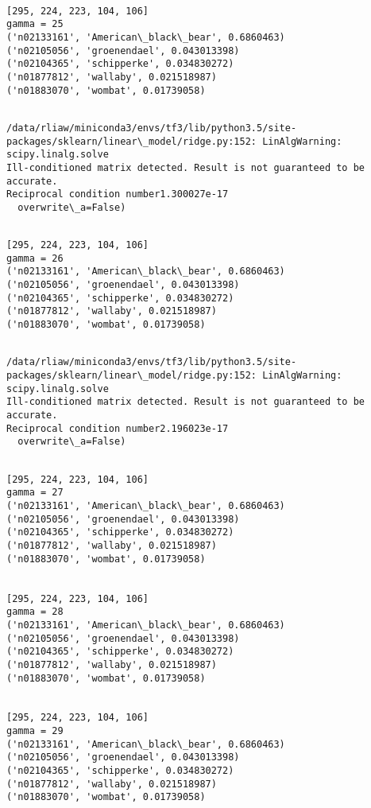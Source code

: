 \documentclass[11pt]{article}
\begin{document}
    \begin{Verbatim}[commandchars=\\\{\}]

[295, 224, 223, 104, 106]
gamma = 25
('n02133161', 'American\_black\_bear', 0.6860463)
('n02105056', 'groenendael', 0.043013398)
('n02104365', 'schipperke', 0.034830272)
('n01877812', 'wallaby', 0.021518987)
('n01883070', 'wombat', 0.01739058)


    \end{Verbatim}

    \begin{Verbatim}[commandchars=\\\{\}]
/data/rliaw/miniconda3/envs/tf3/lib/python3.5/site-packages/sklearn/linear\_model/ridge.py:152: LinAlgWarning: scipy.linalg.solve
Ill-conditioned matrix detected. Result is not guaranteed to be accurate.
Reciprocal condition number1.300027e-17
  overwrite\_a=False)

    \end{Verbatim}

    \begin{Verbatim}[commandchars=\\\{\}]

[295, 224, 223, 104, 106]
gamma = 26
('n02133161', 'American\_black\_bear', 0.6860463)
('n02105056', 'groenendael', 0.043013398)
('n02104365', 'schipperke', 0.034830272)
('n01877812', 'wallaby', 0.021518987)
('n01883070', 'wombat', 0.01739058)


    \end{Verbatim}

    \begin{Verbatim}[commandchars=\\\{\}]
/data/rliaw/miniconda3/envs/tf3/lib/python3.5/site-packages/sklearn/linear\_model/ridge.py:152: LinAlgWarning: scipy.linalg.solve
Ill-conditioned matrix detected. Result is not guaranteed to be accurate.
Reciprocal condition number2.196023e-17
  overwrite\_a=False)

    \end{Verbatim}

    \begin{Verbatim}[commandchars=\\\{\}]

[295, 224, 223, 104, 106]
gamma = 27
('n02133161', 'American\_black\_bear', 0.6860463)
('n02105056', 'groenendael', 0.043013398)
('n02104365', 'schipperke', 0.034830272)
('n01877812', 'wallaby', 0.021518987)
('n01883070', 'wombat', 0.01739058)


[295, 224, 223, 104, 106]
gamma = 28
('n02133161', 'American\_black\_bear', 0.6860463)
('n02105056', 'groenendael', 0.043013398)
('n02104365', 'schipperke', 0.034830272)
('n01877812', 'wallaby', 0.021518987)
('n01883070', 'wombat', 0.01739058)


[295, 224, 223, 104, 106]
gamma = 29
('n02133161', 'American\_black\_bear', 0.6860463)
('n02105056', 'groenendael', 0.043013398)
('n02104365', 'schipperke', 0.034830272)
('n01877812', 'wallaby', 0.021518987)
('n01883070', 'wombat', 0.01739058)


    \end{Verbatim}
\end{document}
